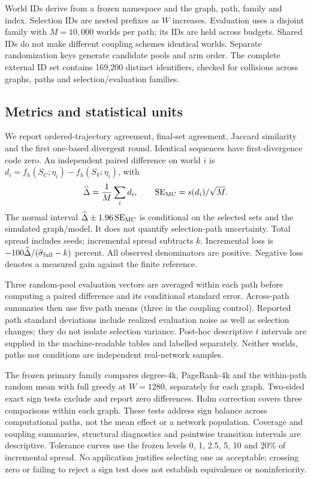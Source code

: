 \documentclass[smallextended]{svjour3}
\begin{document}
World IDs derive from a frozen namespace and the graph, path, family and index. Selection IDs are nested prefixes as $W$ increases. Evaluation uses a disjoint family with $M=10,000$ worlds per path; its IDs are held across budgets. Shared IDs do not make different coupling schemes identical worlds. Separate randomization keys generate candidate pools and arm order. The complete external ID set contains 169,200 distinct identifiers, checked for collisions across graphs, paths and selection/evaluation families.

\subsection{Metrics and statistical units}
We report ordered-trajectory agreement, final-set agreement, Jaccard similarity and the first one-based divergent round. Identical sequences have first-divergence code zero. An independent paired difference on world $i$ is $d_i=f_h(S_C;\eta_i)-f_h(S_V;\eta_i)$, with
\begin{equation}
\widehat\Delta=\frac{1}{M}\sum_i d_i,\qquad
\operatorname{SE}_{\rm MC}=s(d_i)/\sqrt M.
\end{equation}
The normal interval $\widehat\Delta\pm1.96\operatorname{SE}_{\rm MC}$ is conditional on the selected sets and the simulated graph/model. It does not quantify selection-path uncertainty. Total spread includes seeds; incremental spread subtracts $k$. Incremental loss is $-100\widehat\Delta/(\widehat\sigma_{\rm full}-k)$ percent. All observed denominators are positive. Negative loss denotes a measured gain against the finite reference.

Three random-pool evaluation vectors are averaged within each path before computing a paired difference and its conditional standard error. Across-path summaries then use five path means (three in the coupling control). Reported path standard deviations include realized evaluation noise as well as selection changes; they do not isolate selection variance. Post-hoc descriptive $t$ intervals are supplied in the machine-readable tables and labelled separately. Neither worlds, paths nor conditions are independent real-network samples.

The frozen primary family compares degree-4k, PageRank-4k and the within-path random mean with full greedy at $W=1280$, separately for each graph. Two-sided exact sign tests exclude and report zero differences. Holm correction covers three comparisons within each graph. These tests address sign balance across computational paths, not the mean effect or a network population. Coverage and coupling summaries, structural diagnostics and pointwise transition intervals are descriptive. Tolerance curves use the frozen levels 0, 1, 2.5, 5, 10 and 20\% of incremental spread. No application justifies selecting one as acceptable; crossing zero or failing to reject a sign test does not establish equivalence or noninferiority.
\end{document}
